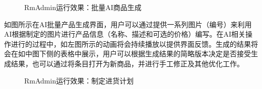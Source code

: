 \begin{figure}[htbp]
    \hfill
    \hfill
	\caption{RmAdmin运行效果：批量AI商品生成}
	\label{fig:rma-ai-bulk}
\end{figure}

如图所示在AI批量产品生成界面，用户可以通过提供一系列图片（编号）来利用AI根据制定的图片进行产品信息（名称、描述和可选的价格）编写。在AI相关操作进行的过程中，如左图所示的动画将会持续播放以提供界面反馈。生成的结果将会在如中图下侧的表格中展示，用户可以根据生成结果的简略版本决定是否接受生成结果，也可以通过将条目打开为新商品，并进行手工修正及其他优化工作。

\begin{figure}[htbp]
    \hfill
    \hfill
	\caption{RmAdmin运行效果：制定进货计划}
	\label{fig:rma-ir-plan}
\end{figure}

